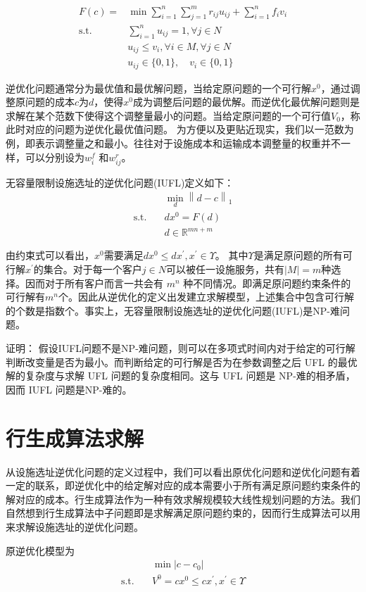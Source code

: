 \documentclass[UTF8]{article}
\begin{document}
\begin{align*}
F(c) = &\min \sum_{i=1}^n \sum_{j=1}^m r_{ij}u_{ij} + \sum_{i=1}^n f_i v_i \\
\text{s.t.}\quad & \sum_{i=1}^n u_{ij} =1, \forall j \in N  \\
& u_{ij}  \leq v_i, \forall i \in M ,\forall j \in N\\
& u_{ij} \in \{0,1\}, \quad v_{i} \in \{0,1\}
\end{align*}

逆优化问题通常分为最优值和最优解问题，当给定原问题的一个可行解$x^0$，通过调整原问题的成本$c$为$d$，使得$x^0$成为调整后问题的最优解。而逆优化最优解问题则是求解在某个范数下使得这个调整量最小的问题。当给定原问题的一个可行值$V_0$，称此时对应的问题为逆优化最优值问题。
为方便以及更贴近现实，我们以一范数为例，即表示调整量之和最小。往往对于设施成本和运输成本调整量的权重并不一样，可以分别设为$w_i^f$ 和$w_{ij}^r$。

无容量限制设施选址的逆优化问题(IUFL)定义如下：
\begin{align*}
&\min_{d} \left\|d-c\right\|_1 \\
\text{s.t.}\quad & dx^0 = F(d) \\
& d \in \mathbb{R}^{mn+m}
\end{align*}

由约束式可以看出，$x^0$需要满足$dx^0 \leq dx^{'}, x^{'} \in \Upsilon$。 其中$\Upsilon$是满足原问题的所有可行解$x^{'}$的集合。对于每一个客户$j \in N$可以被任一设施服务，共有$|M|=m$种选择。因而对于所有客户而言一共会有 $m^n$ 种不同情况。即满足原问题约束条件的可行解有$m^n$个。因此从逆优化的定义出发建立求解模型，上述集合中包含可行解的个数是指数个。事实上，无容量限制设施选址的逆优化问题(IUFL)是NP-难问题。

证明：
假设IUFL问题不是NP-难问题，则可以在多项式时间内对于给定的可行解判断改变量是否为最小。而判断给定的可行解是否为在参数调整之后 UFL 的最优解的复杂度与求解 UFL 问题的复杂度相同。这与 UFL 问题是 NP-难的相矛盾，因而 IUFL 问题是NP-难的。


\section{行生成算法求解}
从设施选址逆优化问题的定义过程中，我们可以看出原优化问题和逆优化问题有着一定的联系，即逆优化中的给定解对应的成本需要小于所有满足原问题约束条件的解对应的成本。行生成算法作为一种有效求解规模较大线性规划问题的方法。我们自然想到行生成算法中子问题即是求解满足原问题约束的，因而行生成算法可以用来求解设施选址的逆优化问题。

原逆优化模型为
\begin{align*}
&\min |c-c_0|  \\
\text{s.t.}\quad & V^0 = cx^0 \leq cx^{'}, x^{'} \in \Upsilon
\end{align*}
\end{document}
